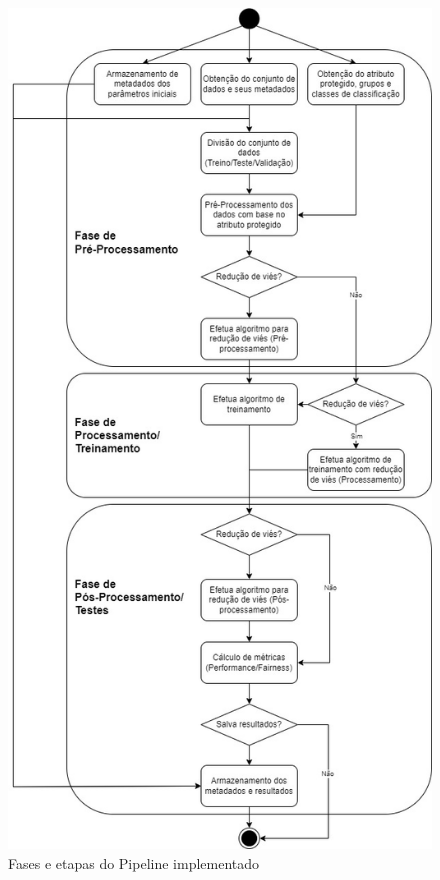 \documentclass[portugues]{ic-tese}
\begin{document}
\begin{figure}[H]
\centering
\includegraphics[scale=0.4]{images/ml-fairness-pipeline.jpg}
\caption {Fases e etapas do Pipeline implementado}
\label{fig:FairnessPipeline}
\end{figure}
\end{document}
